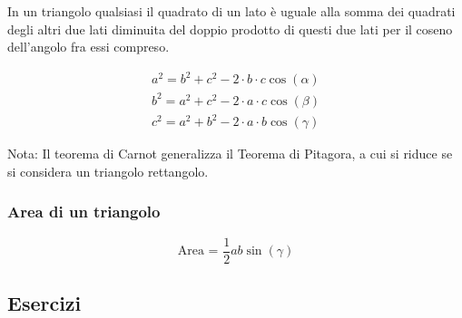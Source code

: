 In un triangolo qualsiasi il quadrato di un lato è uguale alla 
somma dei quadrati degli altri due lati diminuita del doppio prodotto 
di questi due lati per il coseno dell’angolo fra essi compreso.

\begin{equation}
\begin{array}{ll}
a^2=b^2+c^2-2\cdot b\cdot c\cos(\alpha)\\
b^2=a^2+c^2-2\cdot a\cdot c\cos(\beta)\\
c^2=a^2+b^2-2\cdot a\cdot b\cos(\gamma)
\end{array}
\end{equation}

Nota: Il teorema di Carnot generalizza il Teorema di Pitagora,
a cui si riduce se si considera un triangolo rettangolo.

\subsubsection{Area di un triangolo}\label{subs_areatgl}

\begin{equation}
\textrm{Area = }\frac{1}{2}ab \sin(\gamma)
\end{equation}

\subsection{Esercizi}

